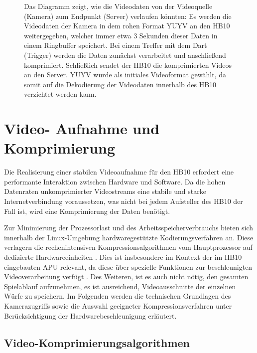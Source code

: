 
\begin{figure}[!b]
    \centering
    
    \caption{Das Diagramm zeigt, wie die Videodaten von der Videoquelle (Kamera) zum Endpunkt (Server) verlaufen könnten: Es werden die Videodaten der Kamera in dem rohen Format YUYV an den HB10 weitergegeben, 
             welcher immer etwa 3 Sekunden dieser Daten in einem Ringbuffer speichert. Bei einem Treffer mit dem Dart (Trigger) werden die Daten zunächst verarbeitet und anschließend komprimiert.
             Schließlich sendet der HB10 die komprimierten Videos an den Server. YUYV wurde als initiales Videoformat gewählt, da somit auf die Dekodierung der Videodaten innerhalb des HB10 verzichtet werden kann.}
    \label{fig:ringbuffer}
\end{figure}

\section{Video- Aufnahme und Komprimierung} \label{sec:1}

Die Realisierung einer stabilen Videoaufnahme für den HB10 erfordert eine performante Interaktion zwischen Hardware und Software. Da die hohen Datenraten unkomprimierter Videostreams eine stabile und starke Internetverbindung voraussetzen, 
was nicht bei jedem Aufsteller des HB10 der Fall ist, wird eine Komprimierung der Daten benötigt.\newline

Zur Minimierung der Prozessorlast und des Arbeitsspeicherverbrauchs bieten sich innerhalb der Linux-Umgebung hardwaregestützte Kodierungsverfahren an. Diese verlagern die rechenintensiven Kompressionsalgorithmen vom Hauptprozessor auf 
dedizierte Hardwareeinheiten \parencite{_2026_ffmpeg}. Dies ist insbesondere im Kontext der im HB10 eingebauten APU relevant, 
da diese über spezielle Funktionen zur beschleunigten Videoverarbeitung verfügt \parencite{_r1000, gpuopenlibrariessdks_2025_amf_video_encode_api}. Des Weiteren, ist es auch nicht nötig, den gesamten Spielablauf aufzunehmen, 
es ist ausreichend, Videoausschnitte der einzelnen Würfe zu speichern. Im Folgenden werden die technischen Grundlagen des Kamerazugriffs sowie die Auswahl geeigneter Kompressionsverfahren unter Berücksichtigung der Hardwarebeschleunigung erläutert.

\subsection{Video-Komprimierungsalgorithmen} \label{sec:compression}

